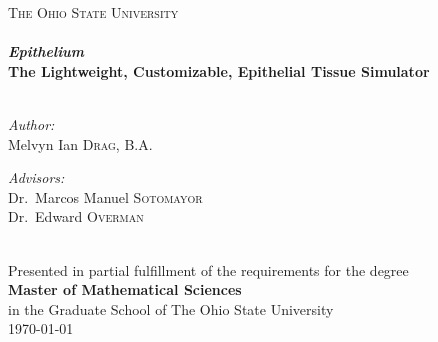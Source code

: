 \begin{titlepage}
\begin{center}

\textsc{\LARGE The Ohio State University}\\[1.5cm]

\HRule \\[0.4cm]
{ \huge \bfseries \emph{Epithelium} \\[0.2cm] \small The Lightweight, Customizable, Epithelial Tissue Simulator \\[0.4cm] }
\HRuleBig \\[1.5cm]

\noindent
\begin{minipage}{0.4\textwidth}
\begin{flushleft} \large
\emph{Author:}\\
Melvyn Ian \textsc{Drag}, B.A. 
\end{flushleft}
\end{minipage}%
\begin{minipage}{0.4\textwidth}
\begin{flushright} \large
\emph{Advisors:} \\
Dr.~Marcos Manuel \textsc{Sotomayor}\\
Dr.~Edward \textsc{Overman}
\end{flushright}
\end{minipage}
\\[4cm]
\vspace{4cm}
Presented in partial fulfillment of the requirements for the degree\\
{\bf{Master of Mathematical Sciences}}\\ in the Graduate School of The Ohio State University \\[1cm]
{\large \today}

\end{center}
\end{titlepage}
